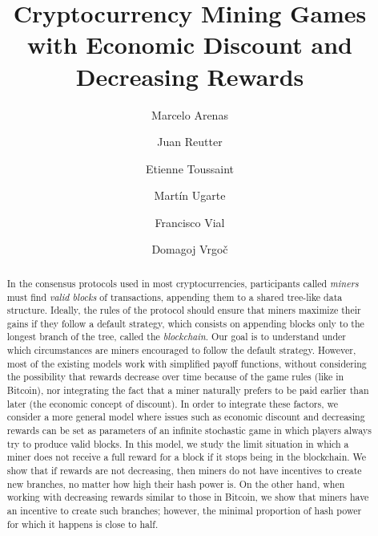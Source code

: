 \documentclass[a4paper,english,cleveref, autoref,numberwithinsect]{lipics-v2019}
\title{Cryptocurrency Mining Games with Economic Discount and Decreasing Rewards}
\author{Marcelo Arenas}{PUC \& IMFD Chile}{marenas@ing.puc.cl}{}{}
\author{Juan Reutter}{PUC \& IMFD Chile}{jreutter@ing.puc.cl}{}{}
\author{Etienne Toussaint}{University of Edinburgh}{etienne.toussaint@ed.ac.uk}{}{}
\author{Mart\'in Ugarte}{PUC \& IMFD Chile}{martin@martinugarte.com}{}{}
\author{Francisco Vial}{ProtonMail \& IMFD Chile}{fvial@pm.me}{}{}
\author{Domagoj Vrgo\v{c}}{PUC \& IMFD Chile}{dvrgoc@ing.puc.cl}{}{}
\begin{document}
\maketitle


\begin{abstract}

    In the consensus protocols used in most cryptocurrencies, participants called \emph{miners} must find \emph{valid blocks} of transactions, appending them to a shared tree-like data structure. Ideally, the rules of the protocol should ensure that miners maximize their gains if they follow a default strategy, which consists on appending blocks only to the longest branch of the tree, called the \emph{blockchain}. 
Our goal is to understand under which circumstances are miners encouraged to follow the default strategy. However, most of the existing models work with simplified payoff functions, without considering the possibility that rewards decrease over time because of the game rules (like in Bitcoin),  
 nor integrating the fact that a miner naturally prefers to be %
 paid earlier than later (the economic concept of discount). In order to integrate these factors, we consider a more general model where issues such as economic discount and decreasing rewards 
can be set as parameters of an infinite stochastic game in which players always try to produce valid blocks. In this model, we study the limit situation in which a miner does not receive a full reward for a block if it stops being in the blockchain. 
We show that  if rewards are not decreasing,
then miners do not have incentives to create new branches, no matter how high their hash power is. On the other hand, when working with decreasing rewards
similar to those in Bitcoin, we show that miners have an incentive to create such branches; however, the minimal proportion of hash power for which it happens is close to half. 




\end{abstract}
\end{document}
